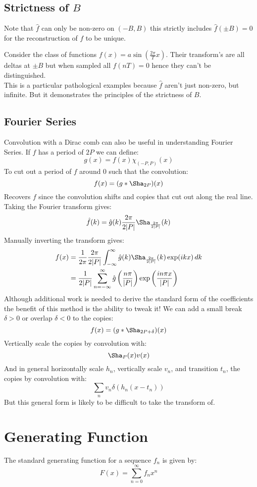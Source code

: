 \subsection{Strictness of $B$}
Note that $\hat{f}$ can only be non-zero on $(-B,B)$ this strictly includes $\hat{f}(\pm B) = 0$ for the reconstruction of $f$ to be unique.

Consider the class of functions $f(x) = a\sin\left(\frac{2\pi}{T}x\right)$.
Their transform's are all deltas at $\pm B$ but when sampled all $f(nT) = 0$ hence they can't be distinguished.
\\

This is a particular pathological examples because $\hat{f}$ aren't just non-zero, but infinite. 
But it demonstrates the principles of the strictness of $B$.

\subsection{Fourier Series}
Convolution with a Dirac comb can also be useful in understanding Fourier Series.
If $f$ has a period of $2P$ we can define:
\[g(x) = f(x)\chi_{(-P,P)}(x)\]
To cut out a period of $f$ around $0$ such that the convolution:
\[f(x) = (g*\Sha_{2P})(x)\]
Recovers $f$ since the convolution shifts and copies that cut out along the real line.
Taking the Fourier transform gives:
\[\hat{f}(k) = \hat{g}(k)\frac{2\pi}{2|P|}\Sha_{\frac{2\pi}{2|P|}}(k)\]
Manually inverting the transform gives:
\[\begin{aligned}
	f(x) &= \frac{1}{2\pi}\frac{2\pi}{2|P|}\int_{-\infty}^{\infty}\hat{g}(k)\Sha_{\frac{2\pi}{2|P|}}(k)\exp(ikx)\,dk\\
	&= \frac{1}{2|P|}\sum_{n=-\infty}^{\infty}\hat{g}\left(\frac{n\pi}{|P|}\right)\exp\left(\frac{in\pi x}{|P|}\right)\\
\end{aligned}\]
Although additional work is needed to derive the standard form of the coefficients the benefit of this method is the ability to tweak it! 
We can add a small break $\delta>0$ or overlap $\delta<0$ to the copies:
\[f(x) = (g*\Sha_{2P+\delta})(x)\]
Vertically scale the copies by convolution with:
\[\Sha_P(x)v(x)\]
And in general horizontally scale $h_n$,
vertically scale $v_n$,
and transition $t_n$,
the copies by convolution with:
\[\sum_nv_n\delta(h_n(x-t_n))\]
But this general form is likely to be difficult to take the transform of.

\section{Generating Function}
The standard generating function for a sequence $f_n$ is given by:
\[F(x) = \sum_{n = 0}^{\infty}f_nx^n\]

